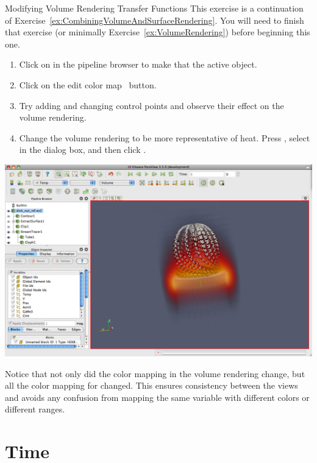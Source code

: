 \begin{exercise}{Modifying Volume Rendering Transfer Functions}
  \label{ex:ModifyingVolumeRenderingTransferFunctions}%
  This exercise is a continuation of
  Exercise~\ref{ex:CombiningVolumeAndSurfaceRendering}.  You will need to
  finish that exercise (or minimally Exercise~\ref{ex:VolumeRendering})
  before beginning this one.

  \begin{enumerate}
  \item Click on  in the pipeline browser to make
    that the active object.
  \item Click on the edit color map~ button.
  \item Try adding and changing control points and observe their effect on
    the volume rendering.
  \item Change the volume rendering to be more representative of heat.
    Press , select
     in the dialog box, and then click .
  \end{enumerate}

  \begin{inlinefig}
    \includegraphics[width=\scw]{images/VolumeRender3}
  \end{inlinefig}

  Notice that not only did the color mapping in the volume rendering
  change, but all the color mapping for  changed.  This ensures
  consistency between the views and avoids any confusion from mapping the
  same variable with different colors or different ranges.
\end{exercise}


\section{Time}

